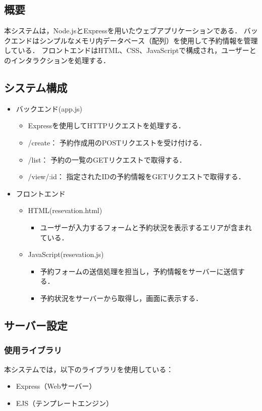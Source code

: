 \documentclass[uplatex,dvipdfmx]{jsarticle}
\begin{document}
\subsection{概要}
本システムは，Node.jsとExpressを用いたウェブアプリケーションである．
バックエンドはシンプルなメモリ内データベース（配列）を使用して予約情報を管理している．
フロントエンドはHTML、CSS、JavaScriptで構成され，ユーザーとのインタラクションを処理する．

\subsection{システム構成}
\begin{itemize}
    \item バックエンド(app.js)
    \begin{itemize}
        \item Expressを使用してHTTPリクエストを処理する．
        \item /create： 予約作成用のPOSTリクエストを受け付ける．
        \item /list： 予約の一覧のGETリクエストで取得する．
        \item /view/:id： 指定されたIDの予約情報をGETリクエストで取得する．
    \end{itemize}
    \item フロントエンド
    \begin{itemize}
        \item HTML(resevation.html)
        \begin{itemize}
            \item ユーザーが入力するフォームと予約状況を表示するエリアが含まれている．
        \end{itemize}
        \item JavaScript(resevation.js)
        \begin{itemize}
            \item 予約フォームの送信処理を担当し，予約情報をサーバーに送信する．
            \item 予約状況をサーバーから取得し，画面に表示する．
        \end{itemize}
    \end{itemize}
\end{itemize}

\subsection{サーバー設定}

\subsubsection{使用ライブラリ}
本システムでは，以下のライブラリを使用している：
\begin{itemize}
    \item Express（Webサーバー）
    \item EJS（テンプレートエンジン）
\end{itemize}
\end{document}
